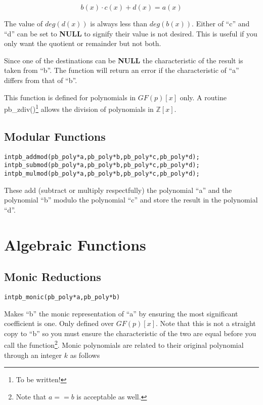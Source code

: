 \documentclass[b5paper]{book}
\def\Z{{\mathbb Z}}
\begin{document}
\begin{equation}
b(x) \cdot c(x) + d(x) = a(x)
\end{equation}

The value of $deg(d(x))$ is always less than $deg(b(x))$.  Either of ``c'' and ``d'' can be set to \textbf{NULL} to 
signify their value is not desired.  This is useful if you only want the quotient or remainder but not both.  

Since one of the destinations can be \textbf{NULL} the characteristic of the result is taken from ``b''.  The function
will return an error if the characteristic of ``a'' differs from that of ``b''.  

This function is defined for polynomials in $GF(p)[x]$ only.  A routine pb\_zdiv()\footnote{To be written!} allows the 
division of polynomials in $\Z[x]$.  

\section{Modular Functions}
  
\begin{alltt}
int pb_addmod(pb_poly *a, pb_poly *b, pb_poly *c, pb_poly *d);
int pb_submod(pb_poly *a, pb_poly *b, pb_poly *c, pb_poly *d);
int pb_mulmod(pb_poly *a, pb_poly *b, pb_poly *c, pb_poly *d);
\end{alltt}

These add (subtract or multiply respectfully) the polynomial ``a'' and the polynomial ``b'' modulo the polynomial ``c''
and store the result in the polynomial ``d''.  

\chapter{Algebraic Functions}

\section{Monic Reductions}
\begin{alltt}
int pb_monic(pb_poly *a, pb_poly *b)
\end{alltt}
Makes ``b'' the monic representation of ``a'' by ensuring the most significant coefficient is one.  Only defined
over $GF(p)[x]$.  Note that this is not a straight copy to ``b'' so you must ensure the characteristic of the two
are equal before you call the function\footnote{Note that $a == b$ is acceptable as well.}.  Monic polynomials
are related to their original polynomial through an integer $k$ as follows
\end{document}
